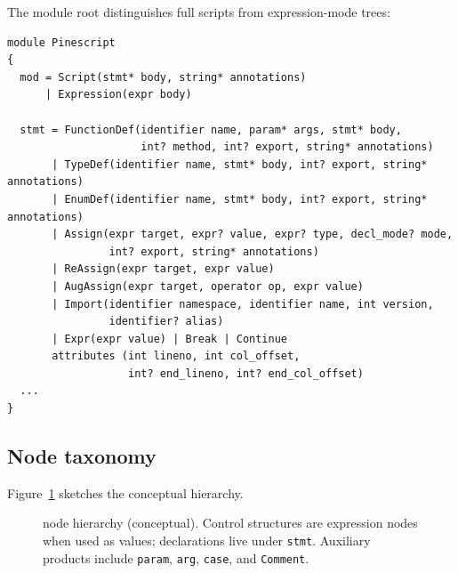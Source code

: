 \documentclass[11pt,a4paper]{article}
\begin{document}
The module root distinguishes full scripts from expression-mode trees:

\begin{lstlisting}[style=python,caption={ASDL module root and statement taxonomy (excerpt from \texttt{Pinescript.asdl}).},label={lst:asdl}]
module Pinescript
{
  mod = Script(stmt* body, string* annotations)
      | Expression(expr body)

  stmt = FunctionDef(identifier name, param* args, stmt* body,
                     int? method, int? export, string* annotations)
       | TypeDef(identifier name, stmt* body, int? export, string* annotations)
       | EnumDef(identifier name, stmt* body, int? export, string* annotations)
       | Assign(expr target, expr? value, expr? type, decl_mode? mode,
                int? export, string* annotations)
       | ReAssign(expr target, expr value)
       | AugAssign(expr target, operator op, expr value)
       | Import(identifier namespace, identifier name, int version,
                identifier? alias)
       | Expr(expr value) | Break | Continue
       attributes (int lineno, int col_offset,
                   int? end_lineno, int? end_col_offset)
  ...
}
\end{lstlisting}

\subsection{Node taxonomy}
\label{sec:taxonomy}

Figure~\ref{fig:asdl-tree} sketches the conceptual hierarchy.

\begin{figure}[t]
\centering
{}
\caption{\asdl{} node hierarchy (conceptual). Control structures are
expression nodes when used as values; declarations live under \texttt{stmt}.
Auxiliary products include \texttt{param}, \texttt{arg}, \texttt{case}, and
\texttt{Comment}.}
\label{fig:asdl-tree}
\end{figure}
\end{document}
